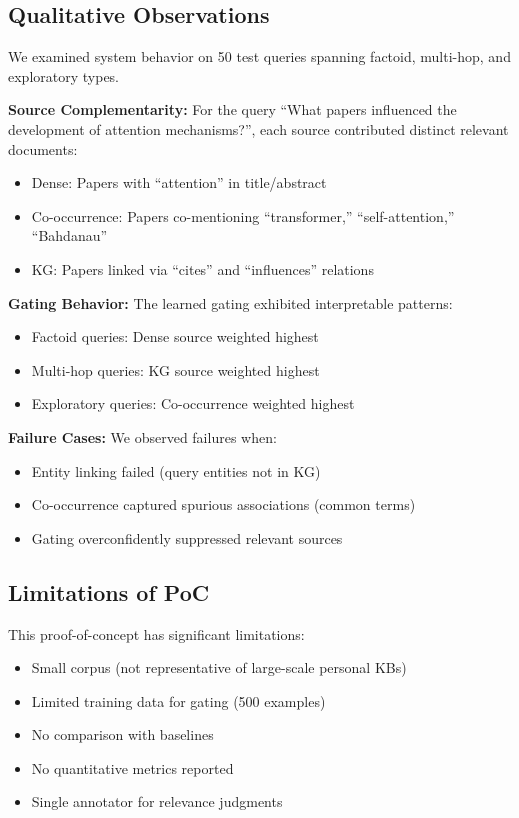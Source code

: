 \documentclass[11pt,a4paper]{article}
\begin{document}
\subsection{Qualitative Observations}

We examined system behavior on 50 test queries spanning factoid, multi-hop, and exploratory types.

\textbf{Source Complementarity:} For the query ``What papers influenced the development of attention mechanisms?'', each source contributed distinct relevant documents:
\begin{itemize}
    \item Dense: Papers with ``attention'' in title/abstract
    \item Co-occurrence: Papers co-mentioning ``transformer,'' ``self-attention,'' ``Bahdanau''
    \item KG: Papers linked via ``cites'' and ``influences'' relations
\end{itemize}

\textbf{Gating Behavior:} The learned gating exhibited interpretable patterns:
\begin{itemize}
    \item Factoid queries: Dense source weighted highest
    \item Multi-hop queries: KG source weighted highest
    \item Exploratory queries: Co-occurrence weighted highest
\end{itemize}

\textbf{Failure Cases:} We observed failures when:
\begin{itemize}
    \item Entity linking failed (query entities not in KG)
    \item Co-occurrence captured spurious associations (common terms)
    \item Gating overconfidently suppressed relevant sources
\end{itemize}

\subsection{Limitations of PoC}

This proof-of-concept has significant limitations:
\begin{itemize}
    \item Small corpus (not representative of large-scale personal KBs)
    \item Limited training data for gating (500 examples)
    \item No comparison with baselines
    \item No quantitative metrics reported
    \item Single annotator for relevance judgments
\end{itemize}
\end{document}
